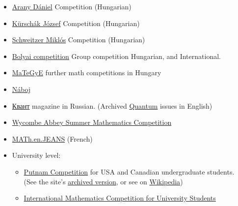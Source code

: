 \documentclass{article}
\begin{document}
\begin{itemize}
\begin{itemize}
        \item \href{https://www.bolyai.hu/versenyek-arany-daniel-matematikaverseny/}{Arany Dániel} Competition (Hungarian)
        
        \item \href{https://www.bolyai.hu/versenyek-kurschak-jozsef-matematikai-tanuloverseny/}{Kürschák József} Competition (Hungarian)
        
        \item \href{https://www.bolyai.hu/versenyek-schweitzer-miklos-emlekverseny/}{Schweitzer Miklós} Competition (Hungarian)
        
        \item \href{http://www.bolyaiverseny.hu/index.html}{Bolyai competition} Group competition Hungarian, and International.
        
        \item \href{http://www.mategye.hu/}{MaTeGyE} further math competitions in Hungary
        
        \item \href{https://math.naboj.org/}{Náboj}
        
        \item \href{http://kvant.mccme.ru/}{Квант} magazine in Russian. (Archived \href{https://www.nsta.org/publications/quantum.aspx}{Quantum} issues in English)
        
        \item \href{https://www.wycombeabbey.com/the-dove-125-mathematics-competition/}{Wycombe Abbey Summer Mathematics Competition}

        \item \href{https://www.mathenjeans.fr/}{MATh.en.JEANS} (French)
        \item University level:
        \begin{itemize}
            \item \href{https://www.maa.org/math-competitions/putnam-competition}{Putnam Competition} for USA and Canadian undergraduate students. (See the site's \href{https://web.archive.org/web/20230201000000*/https://www.maa.org/math-competitions/putnam-competition}{archived version}, or see on \href{https://en.wikipedia.org/wiki/William_Lowell_Putnam_Mathematical_Competition}{Wikipedia})
            
            \item \href{https://www.imc-math.org.uk/}{International Mathematics Competition for University Students}
        \end{itemize}
        

\end{itemize}
\end{itemize}
\end{document}
